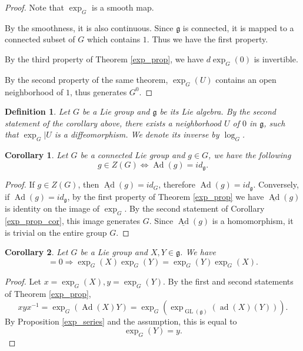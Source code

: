 \documentclass{article}
\newtheorem{definition}{Definition}[section]
\newtheorem{corollary}{Corollary}[section]
\numberwithin{equation}{section}
\DeclareMathOperator{\Ad}{Ad}
\DeclareMathOperator{\ad}{ad}
\DeclareMathOperator{\GL}{GL}
\begin{document}
\begin{proof}Note that $\exp_G$ is a smooth map.\\
\par By the smoothness, it is also continuous. Since $\mathfrak{g}$ is connected, it is mapped to a connected subset of $G$ which contains $1$. Thus we have the first property.\\
\par By the third property of Theorem \ref{exp_prop}, we have $d\exp_G(0)$ is invertible.\\
\par By the second property of the same theorem, $\exp_G(U)$ contains an open neighborhood of $1$, thus generates $G^0$.
\end{proof}

\begin{definition}
Let $G$ be a Lie group and $\mathfrak{g}$ be its Lie algebra. By the second statement of the corollary above, there exists a neighborhood $U$ of $0$ in $\mathfrak{g}$, such that $\exp_G|U$ is a diffeomorphism. We denote its inverse by $\log_G$.
\end{definition}

\begin{corollary}
Let $G$ be a connected Lie group and $g\in G$, we have the following
\begin{equation*}
g\in Z(G) \Leftrightarrow \Ad(g) = id_{\mathfrak{g}}.
\end{equation*}
\end{corollary}

\begin{proof}
If $g\in Z(G)$, then $\underline{\Ad}(g) = id_G$, therefore $\Ad(g)=id_{\mathfrak{g}}$. Conversely, if $\Ad(g)=id_{\mathfrak{g}}$,  by the first property of Theorem \ref{exp_prop} we have $\underline{\Ad}(g)$ is identity on the image of $\exp_G$. By the second statement of Corollary \ref{exp_prop_cor}, this image generates $G$. Since $\underline{\Ad}(g)$ is a homomorphism, it is trivial on the entire group $G$.
\end{proof}

\begin{corollary}
Let $G$ be a Lie group and $X,Y\in\mathfrak{g}$. We have
\begin{equation*}
[X|Y] = 0\Rightarrow \exp_G(X)\exp_G(Y)=\exp_G(Y)\exp_G(X).
\end{equation*}
\end{corollary}
\begin{proof}
Let $x=\exp_G(X),y=\exp_G(Y)$. By the first and second statements of Theorem \ref{exp_prop}, 
\begin{equation*}
xyx^{-1}=\exp_G(\Ad(X)Y) = \exp_G(\exp_{\GL(\mathfrak{g})}(\ad(X)(Y))).
\end{equation*}
By Proposition \ref{exp_series} and the assumption, this is equal to 
\begin{equation*}
\exp_G(Y)=y.
\end{equation*}
\end{proof}
\end{document}
